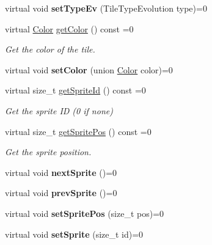 \begin{DoxyCompactItemize}
\mbox{\label{classarcade_1_1ITile_a5f4a3cbd78f7eb6cb87f1c4df10965f1}} 
virtual void {\bfseries set\+Type\+Ev} (Tile\+Type\+Evolution type)=0
\item 
\mbox{\label{classarcade_1_1ITile_adb20cb553bc2ce17dc23125eb70b8329}} 
virtual \hyperlink{unionarcade_1_1Color}{Color} \hyperlink{classarcade_1_1ITile_adb20cb553bc2ce17dc23125eb70b8329}{get\+Color} () const =0
\begin{DoxyCompactList}\small\item\em Get the color of the tile. \end{DoxyCompactList}\item 
\mbox{\label{classarcade_1_1ITile_a88b203de19a7e1737eca40edf0987fc9}} 
virtual void {\bfseries set\+Color} (union \hyperlink{unionarcade_1_1Color}{Color} color)=0
\item 
\mbox{\label{classarcade_1_1ITile_a4c09e2ac12d75fe12e3d4d1ca4e08150}} 
virtual size\+\_\+t \hyperlink{classarcade_1_1ITile_a4c09e2ac12d75fe12e3d4d1ca4e08150}{get\+Sprite\+Id} () const =0
\begin{DoxyCompactList}\small\item\em Get the sprite ID (0 if none) \end{DoxyCompactList}\item 
\mbox{\label{classarcade_1_1ITile_a3e5cec4407ef6afb7e10d82fb1c93f5e}} 
virtual size\+\_\+t \hyperlink{classarcade_1_1ITile_a3e5cec4407ef6afb7e10d82fb1c93f5e}{get\+Sprite\+Pos} () const =0
\begin{DoxyCompactList}\small\item\em Get the sprite position. \end{DoxyCompactList}\item 
\mbox{\label{classarcade_1_1ITile_afbcf7ba28e2eb8c3430c69f4fd13f0cd}} 
virtual void {\bfseries next\+Sprite} ()=0
\item 
\mbox{\label{classarcade_1_1ITile_aa495d321c0cc8042cee126be74b34c00}} 
virtual void {\bfseries prev\+Sprite} ()=0
\item 
\mbox{\label{classarcade_1_1ITile_a215da065ed06206c4d7147322c450490}} 
virtual void {\bfseries set\+Sprite\+Pos} (size\+\_\+t pos)=0
\item 
\mbox{\label{classarcade_1_1ITile_a2269b5042ed7734c1b21f388c9052262}} 
virtual void {\bfseries set\+Sprite} (size\+\_\+t id)=0
\end{DoxyCompactItemize}


